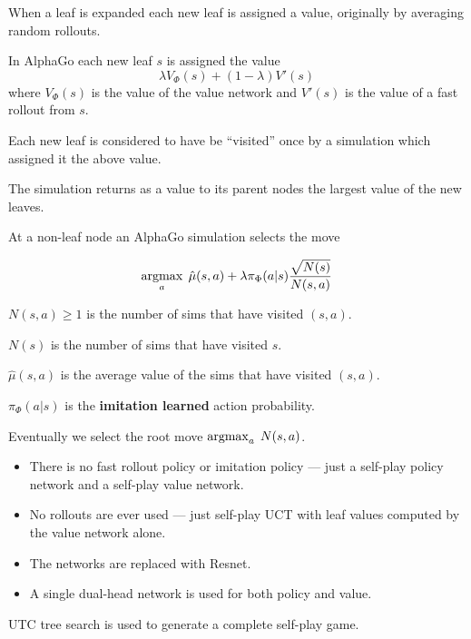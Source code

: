 {

When a leaf is expanded each new leaf is assigned a value, originally by averaging random rollouts.

\vfill
In AlphaGo each new leaf $s$ is assigned the value
$$\lambda V_\Phi(s) + (1-\lambda)V'(s)$$
where $V_\Phi(s)$ is the value of the value network and $V'(s)$ is the value of a fast rollout from $s$.

\vfill
Each new leaf is considered to have be ``visited'' once by a simulation which assigned it the above value.

\vfill
The simulation returns as a value to its parent nodes the largest value of the new leaves.


At a non-leaf node an AlphaGo simulation selects the move

$$\operatorname*{argmax}_a \;\hat{\mu}(s,a) + \lambda \pi_\Phi(a|s)\frac{\sqrt{N(s)}}{N(s,a)}$$

\vfill
$N(s,a) \geq 1$ is the number of sims that have visited $(s,a)$.

\vfill
$N(s)$ is the number of sims that have visited $s$.

\vfill
$\hat{\mu}(s,a)$ is the average value of the sims that have visited $(s,a)$.


\vfill
$\pi_\Phi(a|s)$ is the {\bf imitation learned} action probability.

\vfill
Eventually we select the root move $\operatorname*{argmax}_a\;N(s,a)$.


\begin{itemize}
\item There is no fast rollout policy or imitation policy --- just a self-play policy network and a self-play value network.

\vfill
\item No rollouts are ever used --- just self-play UCT with leaf values computed by the value network alone.

\vfill
\item The networks are replaced with Resnet.

\vfill
\item A single dual-head network is used for both policy and value.  
\end{itemize}


UTC tree search is used to generate a complete self-play game.

}
